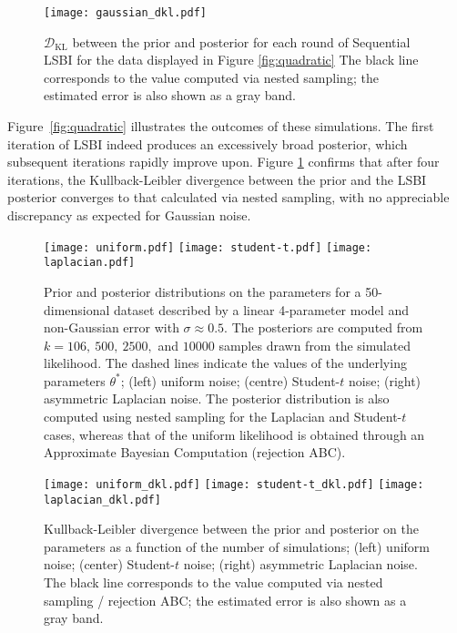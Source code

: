 \documentclass[%
 reprint,
 amsmath,amssymb,
 aps,
]{revtex4-2}
\begin{document}
\begin{figure}[b]
\hspace{-4mm}
\texttt{[image: gaussian\_dkl.pdf]}
\caption{\label{fig:quadratic_dkl}
$\mathcal{D}_\mathrm{KL}$ between the prior and posterior for each round of Sequential LSBI for the data displayed in Figure \ref{fig:quadratic} The black line corresponds to the value computed via nested sampling; the estimated error is also shown as a gray band.
}
\end{figure}

Figure~\ref{fig:quadratic} illustrates the outcomes of these simulations. The first iteration of LSBI indeed produces an excessively broad posterior, which subsequent iterations rapidly improve upon. Figure \ref{fig:quadratic_dkl} confirms that after four iterations, the Kullback-Leibler divergence between the prior and the LSBI posterior converges to that calculated via nested sampling, with no appreciable discrepancy as expected for Gaussian noise. 





\begin{figure*}[t]
\texttt{[image: uniform.pdf]}\qq
\texttt{[image: student-t.pdf]}\qq
\texttt{[image: laplacian.pdf]}
\caption{\label{fig:non_gaussian} Prior and posterior distributions on the parameters for a 50-dimensional dataset described by a linear 4-parameter model and non-Gaussian error with $\sigma\approx 0.5$. The posteriors are computed from $k = 106,\ 500,\ 2500,$ and $10000$ samples drawn from the simulated likelihood. The dashed lines indicate the values of the underlying parameters $\theta^*$; (left) uniform noise; (centre) Student-$t$ noise; (right) asymmetric Laplacian noise. The posterior distribution is also computed using nested sampling for the Laplacian and Student-$t$ cases, whereas that of the uniform likelihood is obtained through an Approximate Bayesian Computation (rejection ABC).}
\end{figure*}


\begin{figure*}[t]
\texttt{[image: uniform\_dkl.pdf]}\qq
\texttt{[image: student-t\_dkl.pdf]}\qq
\texttt{[image: laplacian\_dkl.pdf]}
\caption{\label{fig:non_gaussian_dkl} Kullback-Leibler divergence between the prior and posterior on the parameters as a function of the number of simulations; (left) uniform noise; (center) Student-$t$ noise; (right) asymmetric Laplacian noise. The black line corresponds to the value computed via nested sampling / rejection ABC; the estimated error is also shown as a gray band.}
\end{figure*}
\end{document}

